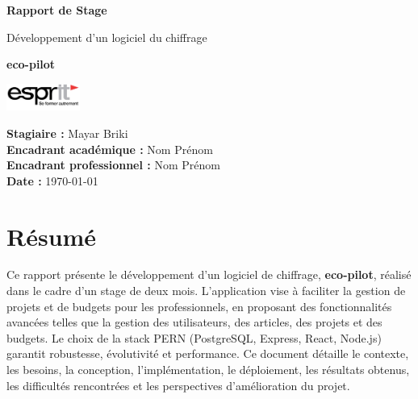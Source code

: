 \documentclass[12pt,a4paper]{report}
\begin{document}
\begin{titlepage}
    \centering
    {\Huge \textbf{Rapport de Stage} \par}
    \vspace{1.5cm}
    {\LARGE Développement d’un logiciel du chiffrage\par}
    \vspace{0.5cm}
    {\Large \textbf{eco-pilot} \par}
    \vspace{1cm}
    \includegraphics[width=0.18\textwidth]{Logo_ESPRIT_Ariana.jpg}
    \vspace{2cm}
    \vfill
    \begin{flushright}
        \textbf{Stagiaire :} Mayar Briki \\
        \textbf{Encadrant académique :} Nom Prénom \\
        \textbf{Encadrant professionnel :} Nom Prénom \\
        \textbf{Date :} \today
    \end{flushright}
\end{titlepage}

\tableofcontents

\chapter*{Résumé}
Ce rapport présente le développement d’un logiciel de chiffrage, \textbf{eco-pilot}, réalisé dans le cadre d’un stage de deux mois. L’application vise à faciliter la gestion de projets et de budgets pour les professionnels, en proposant des fonctionnalités avancées telles que la gestion des utilisateurs, des articles, des projets et des budgets. Le choix de la stack PERN (PostgreSQL, Express, React, Node.js) garantit robustesse, évolutivité et performance. Ce document détaille le contexte, les besoins, la conception, l’implémentation, le déploiement, les résultats obtenus, les difficultés rencontrées et les perspectives d’amélioration du projet.
\end{document}

